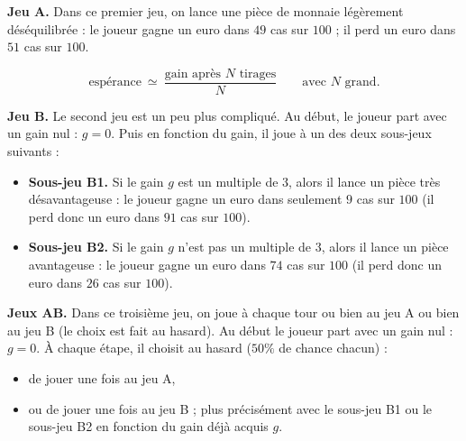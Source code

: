 \documentclass[12pt,class=report,crop=false]{standalone}
\begin{document}
\newcommand{\badletter}[1]{\underline{\textcolor{red}{#1}}}




\textbf{Jeu A.} Dans ce premier jeu, on lance une pièce de monnaie légèrement déséquilibrée : le joueur gagne un euro dans $49$ cas sur $100$ ; il perd un euro dans $51$ cas sur $100$.


\bigskip
\bigskip

   $$\text{espérance} \  \simeq \  \frac{\text{gain après $N$ tirages}}{N} \qquad \text{avec $N$ grand}.$$ 


\newpage

\textbf{Jeu B.} Le second jeu est un peu plus compliqué. Au début, le joueur part avec un gain nul : $g=0$. Puis en fonction du gain, il joue à un des deux sous-jeux suivants :
\begin{itemize}
  \item \textbf{Sous-jeu B1.} Si le gain $g$ est un multiple de $3$, alors il lance un pièce très désavantageuse : le joueur gagne un euro dans seulement $9$ cas sur $100$ (il perd donc un euro dans $91$ cas sur $100$).
  
  \item \textbf{Sous-jeu B2.} Si le gain $g$ n'est pas un multiple de $3$, alors il lance un pièce avantageuse : le joueur gagne un euro dans $74$ cas sur $100$ (il perd donc un euro dans $26$ cas sur $100$).
\end{itemize}


\newpage

\textbf{Jeux AB.} Dans ce troisième jeu, on joue à chaque tour ou bien au jeu A ou bien au jeu B (le choix est fait au hasard). 
Au début le joueur part avec un gain nul : $g=0$. 
\`A chaque étape, il choisit au hasard ($50\%$ de chance chacun) :
\begin{itemize}
  \item de jouer une fois au jeu A,
  \item ou de jouer une fois au jeu B ; plus précisément avec le sous-jeu B1 ou le sous-jeu B2 en fonction du gain déjà acquis $g$.
\end{itemize}
\end{document}
